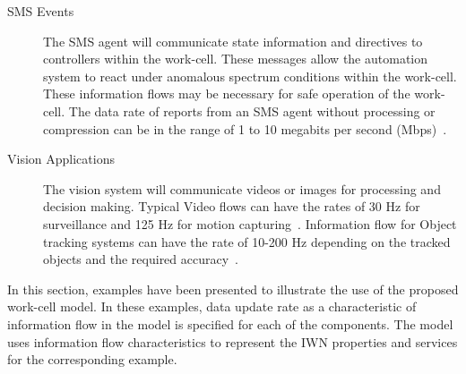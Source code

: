 \documentclass[journal, twoside]{IEEEtran}
\begin{document}
\begin{description}
		\item[SMS Events] The SMS agent will communicate state information and directives to controllers within the work-cell.  These messages allow the automation system to react under anomalous spectrum conditions within the work-cell. These information flows may be necessary for safe operation of the work-cell. The data rate of reports from an SMS agent without processing or compression can be in the range of 1 to 10 megabits per second (Mbps)~\cite{cuevas_2015}.
        
        \item[Vision Applications] The vision system will communicate videos or images for processing and decision making. Typical Video flows can have the rates of 30 Hz for surveillance and 125 Hz for motion capturing~\cite{industrialCCTV, ELWeiss}. Information flow for Object tracking systems can have the rate of 10-200 Hz depending on the tracked objects and the required accuracy~\cite{lidar, motioncapture}. 
  	\end{description}

In this section, examples have been presented to illustrate the use of the proposed work-cell model. In these examples, data update rate as a characteristic of information flow in the model is specified for each of the components. The model uses information flow characteristics to represent the IWN properties and services for the corresponding example. 
	
	
\end{document}
